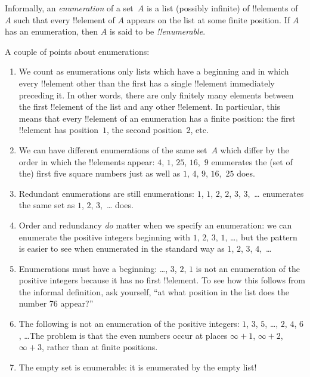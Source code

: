 \begin{defn}
Informally, an \emph{enumeration} of a set~$A$ is a list (possibly
infinite) of !!{element}s of~$A$ such that every !!{element} of $A$
appears on the list at some finite position. If $A$ has an
enumeration, then $A$ is said to be \emph{!!{enumerable}}.
\end{defn}

\begin{explain}
A couple of points about enumerations:
\begin{enumerate}
\item We count as enumerations only lists which have a beginning and
  in which every !!{element} other than the first has a single
  !!{element} immediately preceding it.  In other words, there are
  only finitely many elements between the first !!{element} of the
  list and any other !!{element}. In particular, this means that every
  !!{element} of an enumeration has a finite position: the first
  !!{element} has position~$1$, the second position~$2$, etc.
\item We can have different enumerations of the same set~$A$ which
  differ by the order in which the !!{element}s appear: $4$, $1$,
  $25$, $16$,~$9$ enumerates the (set of the) first five square
  numbers just as well as $1$, $4$, $9$, $16$,~$25$ does.
\item Redundant enumerations are still enumerations: $1$, $1$, $2$,
  $2$, $3$, $3$,~\dots{} enumerates the same set as $1$, $2$,
  $3$,~\dots{} does.
\item Order and redundancy \emph{do} matter when we specify an
  enumeration: we can enumerate the positive integers beginning with
  $1$, $2$, $3$, $1$, \dots{}, but the pattern is easier to see when
  enumerated in the standard way as $1$, $2$, $3$, $4$,~\dots
\item Enumerations must have a beginning: \dots, $3$, $2$, $1$ is not
  an enumeration of the positive integers because it has no first
  !!{element}. To see how this follows from the informal definition,
  ask yourself, ``at what position in the list does the number 76
  appear?''
\item The following is not an enumeration of the positive integers:
  $1$, $3$, $5$, \dots, $2$, $4$, $6$, \dots\@ The problem is that the
  even numbers occur at places $\infty + 1$, $\infty + 2$, $\infty +
  3$, rather than at finite positions.
\item The empty set is enumerable: it is enumerated by the empty list!{}
\end{enumerate}
\end{explain}

